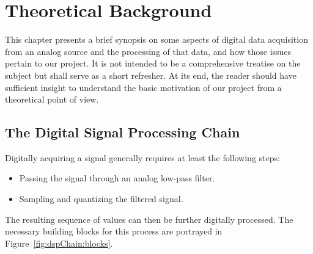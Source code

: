 %
%
\chapter{Theoretical Background} %
\label{ch:theory}
%
%

This  chapter presents  a  brief  synopsis on  some  aspects  of digital  data
acquisition from  an analog source  and the processing  of that data,  and how
those issues pertain to our project. It  is not intended to be a comprehensive
treatise on the subject but shall serve  as a short refresher. At its end, the
reader should  have sufficient insight  to understand the basic  motivation of
our project from a theoretical point of view.

%
%
\section{The Digital Signal Processing Chain}%
\label{sec:dsp_chain}

Digitally acquiring a signal generally requires at least the following steps:
\begin{itemize}\tightlist
        \item
            Passing the signal through an analog low-pass filter.
        \item
            Sampling and quantizing the filtered signal.
\end{itemize}

The   resulting   sequence  of   values   can   then  be   further   digitally
processed. The necessary  building blocks  for this  process are  portrayed in
Figure~\ref{fig:dspChain:blocks}.

